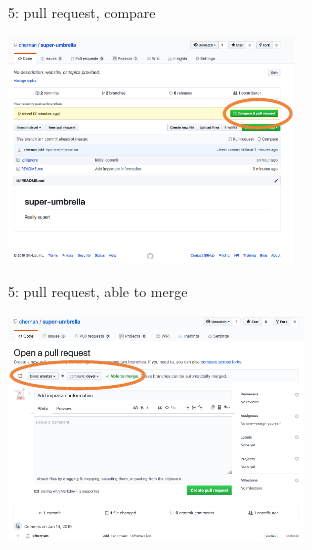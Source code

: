 \begin{frame}{ }
\begin{exampleblock}{5: pull request, compare}
    \begin{center}
    \includegraphics[height=6cm]{05_history/Images/FAIR_githubTP_comparePR.png}
    \end{center}
\end{exampleblock}
\end{frame}
\begin{frame}{ }
\begin{exampleblock}{5: pull request, able to merge}
    \begin{center}
    \includegraphics[height=6cm]{05_history/Images/FAIR_githubTP_mergeEnable.png}
    \end{center}
\end{exampleblock}
\end{frame}
